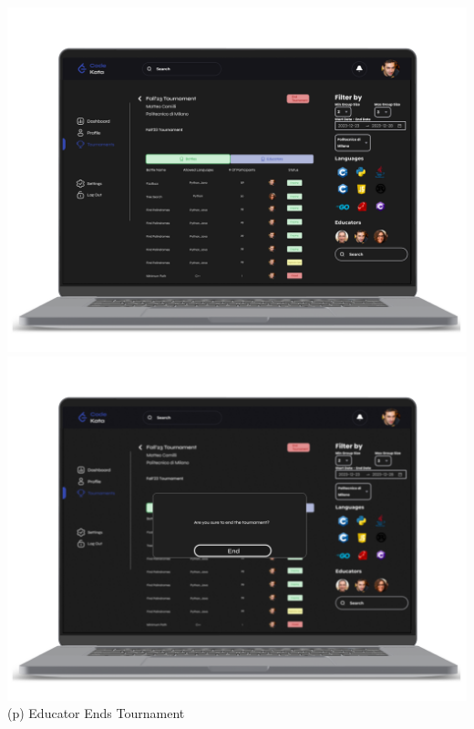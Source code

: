 \begin{center}
\includegraphics[scale=0.13]{Images/ui-ux/educator_end_tournament.png}
\includegraphics[scale=0.13]{Images/ui-ux/educator_end_tournament_1.png}
        (p) Educator Ends Tournament
\end{center}
\newpage